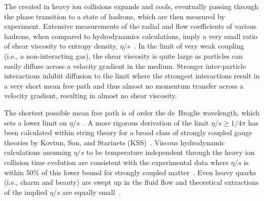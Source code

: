 The \qgp created in heavy ion collisions expands and cools, eventually passing through the
phase transition to a state of hadrons, which are then measured by
experiment.  Extensive measurements of the radial and flow coefficients of
various hadrons, when compared to hydrodynamics calculations, imply a very
small ratio of shear viscosity to entropy density,
$\eta/s$~\cite{Luzum:2008cw}.  In the limit of very weak coupling
(i.e., a non-interacting gas), the shear viscosity is quite large as
particles can easily diffuse across a velocity gradient in the medium.
Stronger inter-particle interactions inhibit diffusion to the limit
where the strongest interactions result in a very short mean free path
and thus almost no momentum transfer across a velocity gradient,
resulting in almost no shear viscosity.  

The shortest possible mean
free path is of order the de~Broglie wavelength, which sets a lower
limit on $\eta/s$~\cite{Danielewicz:1984ww}.  A more rigorous
derivation of the limit $\eta/s \ge 1/4\pi$ has been calculated
within string theory for a broad class of strongly coupled gauge
theories by Kovtun, Son, and Starinets (KSS)~\cite{Kovtun:2004de}.
Viscous hydrodynamic calculations assuming $\eta/s$ to be temperature
independent through the heavy ion collision time evolution are
consistent with the experimental data where $\eta/s$ is within 50\% of
this lower bound for strongly coupled
matter~\cite{Luzum:2008cw,Song:2007ux,Alver:2010dn,Teaney:2009qa,Schenke:2011zz,Adare:2011tg}.
Even heavy quarks (i.e., charm and beauty) are swept up in the fluid
flow and theoretical extractions of the implied $\eta/s$ are equally
small~\cite{Adare:2006nq}.



